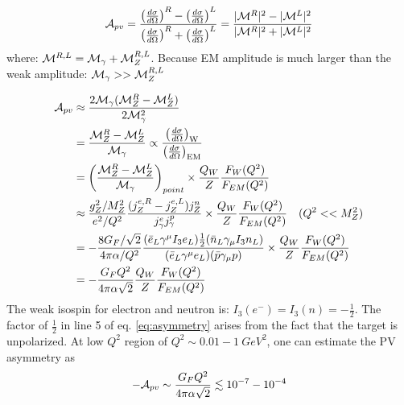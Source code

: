 \begin{equation*}
    \mathcal{A}_{pv} = \frac{\left( \frac{d\sigma}{d\Omega} \right)^R - \left( \frac{d\sigma}{d\Omega} \right)^L}
    {\left( \frac{d\sigma}{d\Omega} \right)^R + \left( \frac{d\sigma}{d\Omega} \right)^L}
    = \frac{|\mathcal{M}^R|^2 - |\mathcal{M}^L|^2}{|\mathcal{M}^R|^2 + |\mathcal{M}^L|^2}
\end{equation*}
where: $\mathcal{M}^{R, L} = \mathcal{M}_{\gamma} + \mathcal{M}_Z^{R,L}$. Because EM amplitude is much 
larger than the weak amplitude: $\mathcal{M}_\gamma >> \mathcal{M}_Z^{R, L}$

\begin{equation}
    \begin{aligned}
	\mathcal{A}_{pv} &\approx \frac{2\mathcal{M}_\gamma (\mathcal{M}_Z^R - \mathcal{M}_Z^L)}{2\mathcal{M}^2_\gamma}	\\
	    &= \frac{\mathcal{M}_Z^R - \mathcal{M}_Z^L}{\mathcal{M}_\gamma} \propto \frac{\left( \frac{d\sigma}{d\Omega} \right)_{\text{W}}}{\left( \frac{d\sigma}{d\Omega} \right)_{\text{EM}}}	\\
	    &= \left(\frac{\mathcal{M}_Z^R - \mathcal{M}_Z^L}{\mathcal{M}_\gamma}\right)_{point} \times \frac{Q_{W}}{Z}\frac{F_{W}(Q^2)}{F_{EM}(Q^2)}    \\
	    &\approx \frac{g^2_Z/M_Z^2}{e^2/Q^2} \frac{(j_Z^{e,R} - j_Z^{e,L}) j_Z^n}{j_\gamma^e j_\gamma^p}
		\times \frac{Q_{W}}{Z}\frac{F_{W}(Q^2)}{F_{EM}(Q^2)} 	\quad (Q^2 << M_Z^2) \\
	    &= -\frac{8G_F/\sqrt{2}}{4\pi\alpha/Q^2} 
		\frac{(\bar{e}_L\gamma^\mu I_3e_L) \frac{1}{2}(\bar{n}_L \gamma_\mu I_3 n_L)}{(\bar{e}_L\gamma^\mu e_L)(\bar{p}\gamma_\mu p)}
		\times \frac{Q_{W}}{Z}\frac{F_{W}(Q^2)}{F_{EM}(Q^2)}    \\
	    &= -\frac{G_F Q^2}{4\pi\alpha\sqrt{2}} \frac{Q_{W}}{Z}\frac{F_{W}(Q^2)}{F_{EM}(Q^2)}
    \end{aligned}
    \label{eq:asymmetry}
\end{equation}
The weak isospin for electron and neutron is: $I_3(e^-) = I_3(n) = -\frac{1}{2}$.
The factor of $\frac{1}{2}$ in line 5 of eq. \ref{eq:asymmetry} arises from
the fact that the target is unpolarized. At low $Q^2$ region of $Q^2 \sim 0.01 - 1 \ GeV^2$,
one can estimate the PV asymmetry as 
\begin{equation}
    -\mathcal{A}_{pv} \sim \frac{G_F Q^2}{4\pi\alpha \sqrt{2}} \lesssim 10^{-7} - 10^{-4}
\end{equation}

